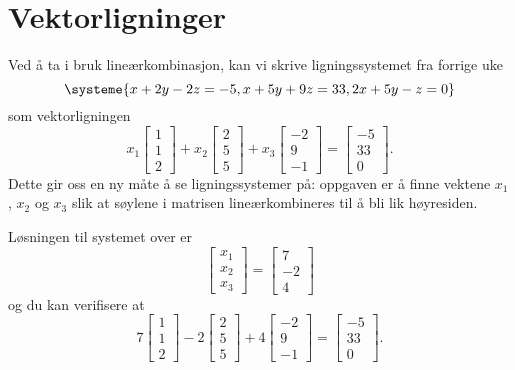 \section*{Vektorligninger}
Ved å ta i bruk lineærkombinasjon, kan vi skrive ligningssystemet fra forrige uke
\[
\systeme{
	x + 2y - 2z = -5,
	x + 5y + 9z = 33,
	2x + 5y -  z = 0
}
\]
som vektorligningen
\begin{equation*}
x_1
\begin{bmatrix}
1     \\
1   \\
2   
\end{bmatrix}
+
x_2
\begin{bmatrix}
2   \\
5   \\
5    
\end{bmatrix}
+
x_3
\begin{bmatrix}
-2   \\
9 \\
-1 
\end{bmatrix}
=
\begin{bmatrix}
-5   \\
33 \\
0 
\end{bmatrix}.
\end{equation*}
Dette gir oss en ny måte å se ligningssystemer på: oppgaven er å finne vektene $x_{1}$, $x_{2}$  og $x_{3}$ slik at s{\o}ylene i matrisen line{\ae}rkombineres til {\aa} bli lik h{\o}yresiden. 
\begin{ex}
	Løsningen til systemet over er
	\begin{equation*}
	\begin{bmatrix}
	x_1  \\
	x_2 \\
	x_3
	\end{bmatrix}
	=
	\begin{bmatrix}
	7  \\
	-2 \\
	4
	\end{bmatrix}
	\end{equation*}
	og du kan verifisere at 
	\begin{equation*}
	7
	\begin{bmatrix}
	1     \\
	1   \\
	2   
	\end{bmatrix}
	-2
	\begin{bmatrix}
	2   \\
	5   \\
	5    
	\end{bmatrix}
	+
	4
	\begin{bmatrix}
	-2   \\
	9 \\
	-1 
	\end{bmatrix}
	=
	\begin{bmatrix}
	-5   \\
	33 \\
	0 
	\end{bmatrix}.
	\end{equation*}
\end{ex}

